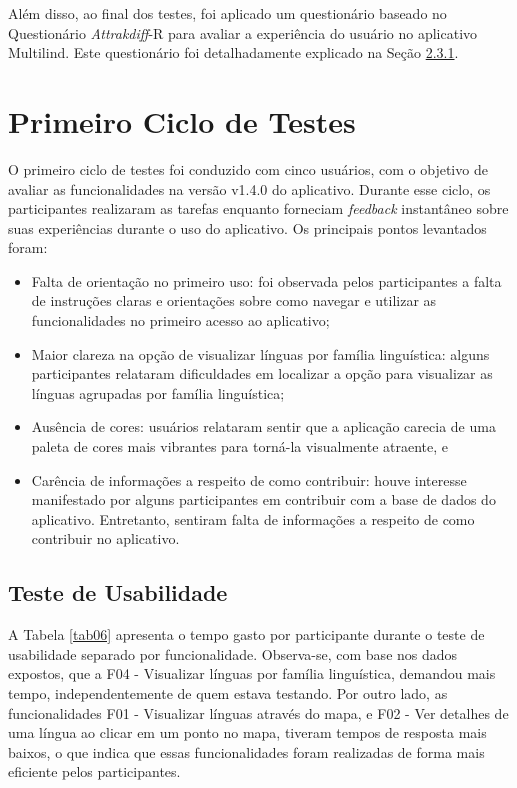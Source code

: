 Além disso, ao final dos testes, foi aplicado um questionário baseado no Questionário \textit{Attrakdiff}-R para avaliar a experiência do usuário no aplicativo Multilind. Este questionário foi detalhadamente explicado na Seção \hyperref[sec:Medicao2]{2.3.1}.

\section{Primeiro Ciclo de Testes}
\label{sec:Primeiro Ciclo}
O primeiro ciclo de testes foi conduzido com cinco usuários, com o objetivo de avaliar as funcionalidades na versão v1.4.0 do aplicativo. Durante esse ciclo, os participantes realizaram as tarefas enquanto forneciam \textit{feedback} instantâneo sobre suas experiências durante o uso 
do aplicativo. Os principais pontos levantados foram:

\begin{itemize}
	\item Falta de orientação no primeiro uso: foi observada pelos participantes a falta de instruções claras e orientações sobre como navegar e utilizar as funcionalidades no primeiro acesso ao aplicativo;
	\item Maior clareza na opção de visualizar línguas por família linguística: alguns participantes relataram dificuldades em localizar a opção para visualizar as línguas agrupadas por família linguística;
	\item Ausência de cores: usuários relataram sentir que a aplicação carecia de uma paleta de cores mais vibrantes para torná-la visualmente atraente, e
	\item Carência de informações a respeito de como contribuir: houve interesse manifestado por alguns participantes em contribuir com a base de dados do aplicativo. Entretanto, sentiram falta de informações a respeito 
	de como contribuir no aplicativo.
\end{itemize}

\subsection{Teste de Usabilidade}
\label{sec:Primeiro Teste de Usabilidade}
A Tabela \ref{tab06} apresenta o tempo gasto por participante durante o teste de usabilidade separado por funcionalidade. Observa-se, com base nos dados expostos, que a F04 - Visualizar línguas por família linguística, 
demandou mais tempo, independentemente de quem estava testando. Por outro lado, as funcionalidades F01 - Visualizar línguas através do mapa, e F02 - Ver detalhes de uma língua ao clicar em um ponto no mapa, tiveram tempos 
de resposta mais baixos, o que indica que essas funcionalidades foram realizadas de forma mais eficiente pelos participantes.

